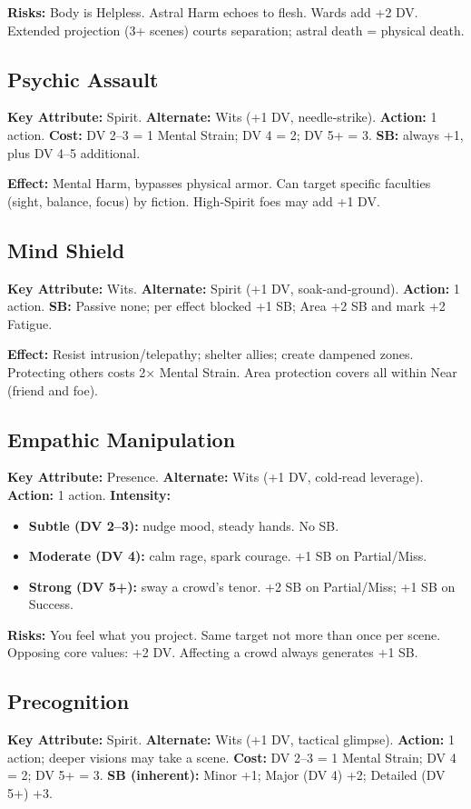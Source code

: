\documentclass[10pt,a5paper]{book}
\begin{document}
\textbf{Risks:} Body is Helpless. Astral Harm echoes to flesh. Wards add +2 DV. Extended projection (3+ scenes) courts separation; astral death = physical death.

\subsection{Psychic Assault}
\textbf{Key Attribute:} Spirit. \textbf{Alternate:} Wits (+1 DV, needle‑strike). \textbf{Action:} 1 action. \textbf{Cost:} DV 2--3 = 1 Mental Strain; DV 4 = 2; DV 5+ = 3. \textbf{SB:} always +1, plus DV 4--5 additional.

\textbf{Effect:} Mental Harm, bypasses physical armor. Can target specific faculties (sight, balance, focus) by fiction. High‑Spirit foes may add +1 DV.

\subsection{Mind Shield}
\textbf{Key Attribute:} Wits. \textbf{Alternate:} Spirit (+1 DV, soak‑and‑ground). \textbf{Action:} 1 action. \textbf{SB:} Passive none; per effect blocked +1 SB; Area +2 SB and mark +2 Fatigue.

\textbf{Effect:} Resist intrusion/telepathy; shelter allies; create dampened zones. Protecting others costs 2× Mental Strain. Area protection covers all within Near (friend and foe).

\subsection{Empathic Manipulation}
\textbf{Key Attribute:} Presence. \textbf{Alternate:} Wits (+1 DV, cold‑read leverage). \textbf{Action:} 1 action. \textbf{Intensity:}
\begin{itemize}
    \item \textbf{Subtle (DV 2--3):} nudge mood, steady hands. No SB.
    \item \textbf{Moderate (DV 4):} calm rage, spark courage. +1 SB on Partial/Miss.
    \item \textbf{Strong (DV 5+):} sway a crowd's tenor. +2 SB on Partial/Miss; +1 SB on Success.
\end{itemize}

\textbf{Risks:} You feel what you project. Same target not more than once per scene. Opposing core values: +2 DV. Affecting a crowd always generates +1 SB.

\subsection{Precognition}
\textbf{Key Attribute:} Spirit. \textbf{Alternate:} Wits (+1 DV, tactical glimpse). \textbf{Action:} 1 action; deeper visions may take a scene. \textbf{Cost:} DV 2--3 = 1 Mental Strain; DV 4 = 2; DV 5+ = 3. \textbf{SB (inherent):} Minor +1; Major (DV 4) +2; Detailed (DV 5+) +3.
\end{document}

